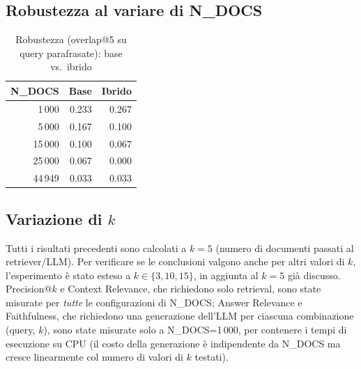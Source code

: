 \documentclass[12pt,a4paper]{article}
\begin{document}
\subsection{Robustezza al variare di N\_DOCS}

\begin{table}[H]
  \centering
  \caption{Robustezza (overlap@5 su query parafrasate): base vs.\ ibrido}
  \label{tab:robustezza}
  \begin{tabular}{rrr}
    \toprule
    \textbf{N\_DOCS} & \textbf{Base} & \textbf{Ibrido} \\
    \midrule
    1\,000  & 0.233 & 0.267 \\
    5\,000  & 0.167 & 0.100 \\
    15\,000 & 0.100 & 0.067 \\
    25\,000 & 0.067 & 0.000 \\
    44\,949 & 0.033 & 0.033 \\
    \bottomrule
  \end{tabular}
\end{table}

\subsection{Variazione di $k$}
\label{sec:variazione-k}

Tutti i risultati precedenti sono calcolati a $k=5$ (numero di documenti passati al retriever/LLM). Per verificare se le conclusioni valgono anche per altri valori di $k$, l'esperimento \`e stato esteso a $k \in \{3, 10, 15\}$, in aggiunta al $k=5$ gi\`a discusso. Precision@$k$ e Context Relevance, che richiedono solo retrieval, sono state misurate per \emph{tutte} le configurazioni di N\_DOCS; Answer Relevance e Faithfulness, che richiedono una generazione dell'LLM per ciascuna combinazione (query, $k$), sono state misurate solo a N\_DOCS=1\,000, per contenere i tempi di esecuzione su CPU (il costo della generazione \`e indipendente da N\_DOCS ma cresce linearmente col numero di valori di $k$ testati).
\end{document}

